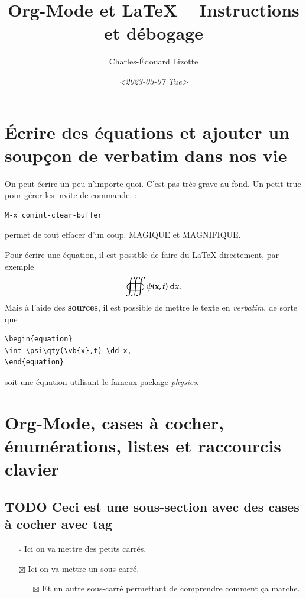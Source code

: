 \documentclass[8pt]{article}
\author{Charles-Édouard Lizotte}
\date{\textit{<2023-03-07 Tue>}}
\title{Org-Mode et \LaTeX{} -- Instructions et débogage}
\numberwithin{equation}{section}
\begin{document}
\maketitle
\tableofcontents



\section{Écrire des équations et ajouter un soupçon de \textbf{verbatim} dans nos vie}
\label{sec:orgfa69a68}
On peut écrire un peu n'importe quoi. C'est pas très grave au fond. Un petit truc pour gérer les invite de commande. :
\begin{verbatim}
M-x comint-clear-buffer
\end{verbatim}
permet de tout effacer d'un coup. MAGIQUE et MAGNIFIQUE.\newline

Pour écrire une équation, il est possible de faire du \LaTeX{} directement, par exemple 
\begin{equation}
\oiiint \psi\qty(\vb{x},t)\ \dd x.
\end{equation}
Mais à l'aide des \textbf{sources}, il est possible de mettre le texte en \emph{verbatim}, de sorte que
\begin{verbatim}
\begin{equation}
\int \psi\qty(\vb{x},t) \dd x, 
\end{equation}
\end{verbatim}
soit une équation utilisant le fameux package \emph{physics}.

\section{Org-Mode, cases à cocher, énumérations, listes et raccourcis clavier}
\label{sec:org21ce7c2}
\subsection{{\bfseries\sffamily TODO} Ceci est une sous-section avec des cases à cocher avec tag}
\label{sec:orgb7c3309}
\begin{itemize}
\item[{$\square$}] Ici on va mettre des petits carrés.
\item[{$\boxtimes$}] Ici on va mettre un sous-carré.
\begin{itemize}
\item[{$\boxtimes$}] Et un autre sous-carré permettant de comprendre comment ça marche.
\end{itemize}
\end{itemize}
\end{document}
